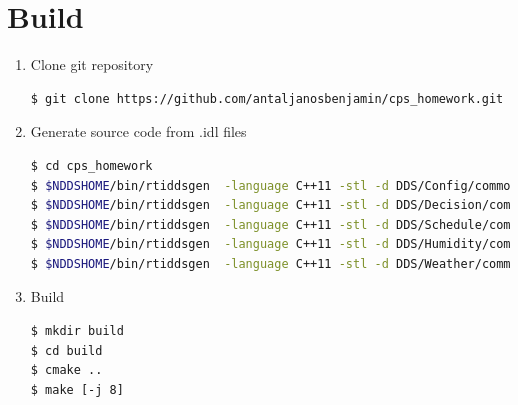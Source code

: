 \documentclass{article}
\begin{document}
\section{Build}
\begin{enumerate}
\item Clone git repository
\begin{lstlisting}
$ git clone https://github.com/antaljanosbenjamin/cps_homework.git
\end{lstlisting}
\item Generate source code from .idl files
\begin{lstlisting}[language=bash]
$ cd cps_homework
$ $NDDSHOME/bin/rtiddsgen  -language C++11 -stl -d DDS/Config/common -replace idl_files/Config.idl
$ $NDDSHOME/bin/rtiddsgen  -language C++11 -stl -d DDS/Decision/common -replace idl_files/Decision.idl
$ $NDDSHOME/bin/rtiddsgen  -language C++11 -stl -d DDS/Schedule/common -replace idl_files/Schedule.idl
$ $NDDSHOME/bin/rtiddsgen  -language C++11 -stl -d DDS/Humidity/common -replace idl_files/UvegHaz.idl
$ $NDDSHOME/bin/rtiddsgen  -language C++11 -stl -d DDS/Weather/common -replace idl_files/Weather.idl
\end{lstlisting}
\item Build
\begin{lstlisting}
$ mkdir build
$ cd build
$ cmake ..
$ make [-j 8]
\end{lstlisting}
\end{enumerate}
\end{document}
